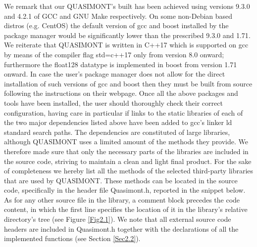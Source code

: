 \documentclass[a4paper, twosided]{book}
\begin{document}
\noindent
We remark that our QUASIMONT's built has been achieved using versions \colorbox{poliGrayBlue}{9.3.0} and \colorbox{poliGrayBlue}{4.2.1} of GCC and GNU Make respectively. On some non-Debian based distros (e.g. CentOS) the default version of \colorbox{poliGrayBlue}{gcc} and \colorbox{poliGrayBlue}{boost} installed by the package manager would be significantly lower than the prescribed \colorbox{poliGrayBlue}{9.3.0} and \colorbox{poliGrayBlue}{1.71}. We reiterate that QUASIMONT is written in C++17 which is supported on \colorbox{poliGrayBlue}{gcc} by means of the compiler flag \colorbox{poliGrayBlue}{std=c++17} only from version \colorbox{poliGrayBlue}{8.0} onward; furthermore the \colorbox{poliGrayBlue}{float128} datatype is implemented in \colorbox{poliGrayBlue}{boost} from version \colorbox{poliGrayBlue}{1.71} onward. In case the user's package manager does not allow for the direct installation of such versions of \colorbox{poliGrayBlue}{gcc} and \colorbox{poliGrayBlue}{boost} then they must be built from source following the instructions on their webpage. Once all the above packages and tools have been installed, the user should thoroughly check their correct configuration, having care in particular if links to the static libraries of each of the two major dependencies listed above have been added to \colorbox{poliGrayBlue}{gcc}'s linker \colorbox{poliGrayBlue}{ld} standard search paths. The dependencies are constituted of large libraries, although QUASIMONT uses a limited amount of the methods they provide. We therefore made sure that only the necessary parts of the libraries are included in the source code, striving to maintain a clean and light final product. For the sake of completeness we hereby list all the methods of the selected third-party libraries  that are used by QUASIMONT.  These methods can be located in the source code, specifically in the header file \colorbox{poliGrayBlue}{Quasimont.h}, reported in the snippet below. As for any other source file in the library, a comment block precedes the code content, in which the first line specifies the location of it in the library's relative directory's tree (see Figure \ref{Fig2.1}).
We note that all external source code headers are included in \colorbox{poliGrayBlue}{Quasimont.h} together with the declarations of all the implemented functions (see Section \ref{Sec2.2}).

\newpage
\vspace{0.5cm}
\vspace{0.5cm}
\end{document}
